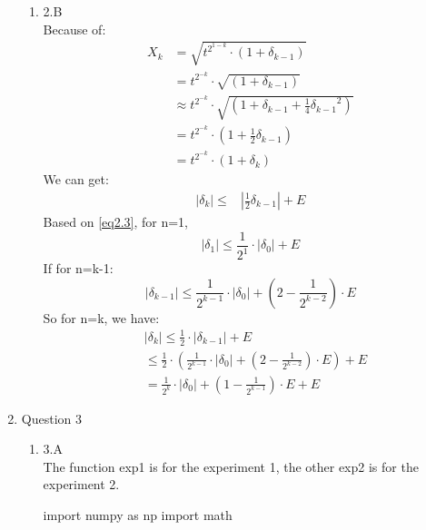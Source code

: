 \documentclass[12pt]{article}
\begin{document}
\begin{enumerate}
\begin{enumerate}
  \item 2.B \\
  Because of:
  \begin{equation}
  \begin{split}
  \label{eq2.2} 
{X_k} &= \sqrt {{t^{{2^{1 - k}}}} \cdot (1 + {\delta _{k - 1}})}  \\
  &= {t^{{2^{ - k}}}} \cdot \sqrt {(1 + {\delta _{k - 1}})}  \\
  &\approx {t^{{2^{ - k}}}} \cdot \sqrt {(1 + {\delta _{k - 1}} + \frac{1}{4}{\delta _{k - 1}}^2)} \\
 &= {t^{{2^{ - k}}}} \cdot (1 + \frac{1}{2}{\delta _{k - 1}})\\
 &= {t^{{2^{ - k}}}} \cdot (1 + {\delta _k})
\end{split}
  \end{equation}
  We can get:
    \begin{equation}
  \begin{split}
  \label{eq2.3} 
  \left| {{\delta _k}} \right| \le &\left| {\frac{1}{2}{\delta _{k - 1}}} \right| + E
\end{split}
  \end{equation}
  Based on \eqref{eq2.3}, for n=1, \[\left| {{\delta _1}} \right| \le \frac{1}{{{2^1}}} \cdot \left| {{\delta _0}} \right| + E\]
  If for n=k-1: 
  \[\left| {{\delta _{k - 1}}} \right| \le \frac{1}{{{2^{k - 1}}}} \cdot \left| {{\delta _0}} \right| + (2 - \frac{1}{{{2^{k - 2}}}}) \cdot E\]
  So for n=k, we have:
      \begin{equation}
  \begin{split}
  \label{eq2.3} 
&\left| {{\delta _k}} \right| \le \frac{1}{2} \cdot \left| {{\delta _{k - 1}}} \right| + E\\
 &\le \frac{1}{2} \cdot (\frac{1}{{{2^{k - 1}}}} \cdot \left| {{\delta _0}} \right| + (2 - \frac{1}{{{2^{k - 2}}}}) \cdot E) + E\\
 &= \frac{1}{{{2^k}}} \cdot \left| {{\delta _0}} \right| + (1 - \frac{1}{{{2^{k - 1}}}}) \cdot E + E
  \end{split}
  \end{equation}
    \end{enumerate}
\newpage

\item Question 3
  \begin{enumerate}
  \item 3.A \\
The function exp1 is for the experiment 1, the other exp2 is for the experiment 2.
  \begin{python}
import numpy as np
import math


\end{python}
\end{enumerate}
\end{enumerate}
\end{document}
